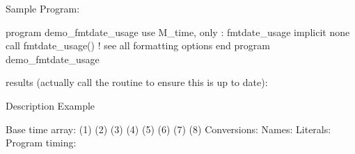 \begin{DoxyVerb}Sample Program:

 program demo_fmtdate_usage
 use M_time, only : fmtdate_usage
 implicit none
    call fmtdate_usage() ! see all formatting options
 end program demo_fmtdate_usage

results (actually call the routine to ensure this is up to date):

 Description                                        Example

 Base time array:
 (1) %
 (2) %
 (3) %
 (4) %
 (5) %
 (6) %
 (7) %
 (8) %
 Conversions:
  Names:
  Literals:
  Program timing:


\end{DoxyVerb}
